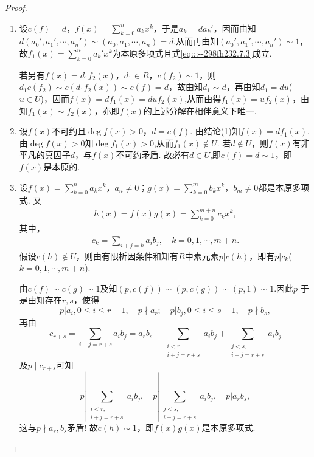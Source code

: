 \documentclass[../../main.tex]{subfiles}%
\begin{document}
\begin{proof}
\begin{enumerate}[(1)]
\item 设$c(f)=d$，$f(x)=\sum\limits_{k=0}^n a_kx^k$，于是$a_k = da_k'$，因而由知$d(a_0', a_1', \cdots, a_n') \sim (a_0, a_1, \cdots, a_n) = d$,从而再由知$(a_0', a_1', \cdots, a_n') \sim 1$，故$f_1(x)=\sum\limits_{k=0}^n a_k'x^k$为本原多项式且式\eqref{eq:::--298fh232.7.3}成立.

若另有$f(x)=d_1f_2(x)$，$d_1 \in R$，$c(f_2) \sim 1$，则$d_1c(f_2) \sim c(d_1f_2(x)) \sim c(f)=d$，故由知$d_1 \sim d$，再由知$d_1 = du$($u \in U$)，因而$f\left( x \right) =df_1\left( x \right) =duf_2\left( x \right) $,从而由得$f_1(x) = uf_2(x)$，由知$f_1(x) \sim f_2(x)$，亦即$f(x)$的上述分解在相伴意义下唯一.

\item 设$f(x)$不可约且$\deg f(x) > 0$，$d = c(f)$. 由结论(1)知$f(x) = df_1(x)$.由$\deg f(x)>0$知$\deg f_1(x)>0$,从而$f_1(x) \notin U$. 若$d \notin U$，则$f(x)$有非平凡的真因子$d$，与$f(x)$不可约矛盾. 故必有$d\in U$,即$c(f) = d \sim 1$，即$f(x)$是本原的.

\item 设$f(x)=\sum\limits_{k=0}^n a_kx^k$，$a_n \neq 0$；$g(x)=\sum\limits_{k=0}^m b_kx^k$，$b_m \neq 0$都是本原多项式. 又
\begin{align*}
h(x) = f(x)g(x) = \sum\limits_{k=0}^{m+n} c_kx^k,
\end{align*}
其中，
\begin{align*}
c_k = \sum\limits_{i+j=k} a_ib_j, \quad k=0,1,\cdots,m+n.
\end{align*}
假设$c(h) \notin U$，则由有限析因条件和知有$R$中素元素$p|c(h)$，即有$p|c_k$($k=0,1,\cdots,m+n$).

由$c(f) \sim c(g) \sim 1$及知$(p,c(f))\sim (p,c(g))\sim (p,1)\sim 1$.因此$p$
于是由知存在$r, s$，使得
\[
p|a_i, 0 \leqslant i \leqslant r-1, \quad p \nmid a_r; \quad p|b_j, 0 \leqslant i \leqslant s-1, \quad p \nmid b_s,
\]
再由
\[
c_{r+s} = \sum\limits_{i+j=r+s} a_ib_j = a_rb_s + \sum\limits_{\substack{i<r, \\ i+j=r+s}} a_ib_j + \sum\limits_{\substack{j<s, \\ i+j=r+s}} a_ib_j
\]
及$p\mid c_{r+s}$可知
\[
p \left| \sum\limits_{\substack{i<r, \\ i+j=r+s}} a_ib_j, \quad p \left| \sum\limits_{\substack{j<s, \\ i+j=r+s}} a_ib_j, \quad p|a_rb_s,
\right. \right.
\]
这与$p\nmid a_r,b_s$矛盾! 故$c(h) \sim 1$，即$f(x)g(x)$是本原多项式.
\end{enumerate}
\end{proof}
\end{document}

